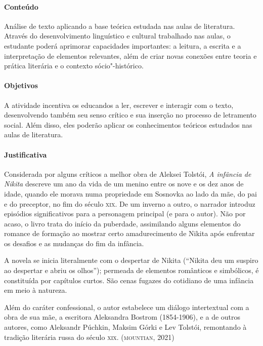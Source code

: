 \documentclass{article}
\begin{document}
\bnccativividadesposleitura
{}

\paragraph{Conteúdo}
Análise de texto aplicando a base teórica estudada nas aulas de
literatura. Através do desenvolvimento linguístico e cultural trabalhado
nas aulas, o estudante poderá aprimorar capacidades importantes: a
leitura, a escrita e a interpretação de elementos relevantes, além de
criar novas conexões entre teoria e prática literária e o contexto
sócio"-histórico.

\paragraph{Objetivos}
A atividade incentiva os educandos a ler, escrever e interagir com o
texto, desenvolvendo também seu senso crítico e sua inserção no processo
de letramento social. Além disso, eles poderão aplicar os conhecimentos
teóricos estudados nas aulas de literatura.

\paragraph{Justificativa}
Considerada por alguns críticos a melhor obra de Aleksei Tolstói,
\emph{A infância de Nikita} descreve um ano da vida de um menino entre
os nove e os dez anos de idade, quando ele morava numa propriedade em
Sosnovka ao lado da mãe, do pai e do preceptor, no fim do século \textsc{xix}. De
um inverno a outro, o narrador introduz episódios significativos para a
personagem principal (e para o autor). Não por acaso, o livro trata do
início da puberdade, assimilando alguns elementos do romance de formação
ao mostrar certo amadurecimento de Nikita após enfrentar os desafios e
as mudanças do fim da infância.

A novela se inicia literalmente com o despertar de Nikita (``Nikita deu
um suspiro ao despertar e abriu os olhos''); permeada de elementos
românticos e simbólicos, é constituída por capítulos curtos. São cenas
fugazes do cotidiano de uma infância em meio à natureza.

Além do caráter confessional, o autor estabelece um diálogo intertextual
com a obra de sua mãe, a escritora Aleksandra Bostrom (1854-1906), e a
de outros autores, como Aleksandr Púchkin, Maksim Górki e Lev Tolstói,
remontando à tradição literária russa do século \textsc{xix}. (\textsc{mountian}, 2021)
\end{document}

